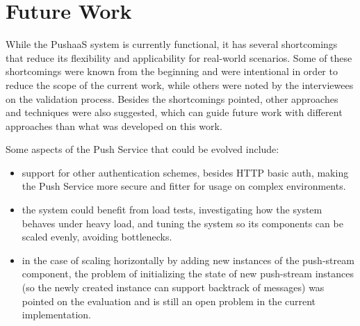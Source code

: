 \section{Future Work} \label{section-future-work}

While the PushaaS system is currently functional, it has several shortcomings that reduce its flexibility and applicability for real-world scenarios. Some of these shortcomings were known from the beginning and were intentional in order to reduce the scope of the current work, while others were noted by the interviewees on the validation process. Besides the shortcomings pointed, other approaches and techniques were also suggested, which can guide future work with different approaches than what was developed on this work.

Some aspects of the Push Service that could be evolved include:
\begin{itemize}
    \item support for other authentication schemes, besides HTTP basic auth, making the Push Service more secure and fitter for usage on complex environments.
    \item the system could benefit from load tests, investigating how the system behaves under heavy load, and tuning the system so its components can be scaled evenly, avoiding bottlenecks.
    \item in the case of scaling horizontally by adding new instances of the push-stream component, the problem of initializing the state of new push-stream instances (so the newly created instance can support backtrack of messages) was pointed on the evaluation and is still an open problem in the current implementation.
\end{itemize}

